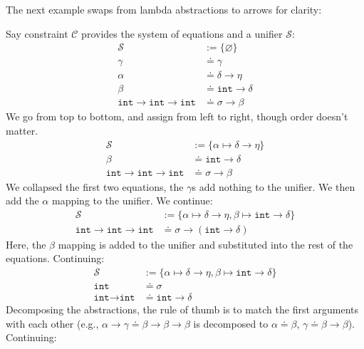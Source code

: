 \noindent
The next example swaps from lambda abstractions to arrows for clarity:
\begin{Example}

    Say constraint $\mathcal{C}$ provides the system of equations and a unifier $\mathcal{S}$:
    \begin{align*}
        \mathcal{S} &:= \{\varnothing\}\\
        \gamma &\doteq \gamma\\ 
        \alpha &\doteq \delta \to \eta \\
        \beta &\doteq \texttt{int} \to \delta\\
        \texttt{int} \to \texttt{int} \to \texttt{int} &\doteq \sigma \to \beta
    \end{align*}
    \noindent
    We go from top to bottom, and assign from left to right, though order doesn't matter.
    \begin{align*}
    \mathcal{S} &:= \{\alpha \mapsto \delta \to \eta\}\\
    \beta &\doteq \texttt{int} \to \delta\\
    \texttt{int} \to \texttt{int} \to \texttt{int} &\doteq \sigma \to \beta
    \end{align*}
    \noindent
    We collapsed the first two equations, the $\gamma$s add nothing to the unifier. We then add the $\alpha$ mapping to the unifier.
    We continue:
    \begin{align*} 
        \mathcal{S} &:= \{\alpha \mapsto \delta \to \eta, \beta \mapsto \texttt{int} \to \delta\}\\
        \texttt{int} \to \texttt{int} \to \texttt{int} &\doteq \sigma \to (\texttt{int} \to \delta)
    \end{align*}
    \noindent
    Here, the $\beta$ mapping is added to the unifier and substituted into the rest of the equations. Continuing:
    \begin{align*}
        \mathcal{S} &:= \{\alpha \mapsto \delta \to \eta, \beta \mapsto \texttt{int} \to \delta\}\\
        \texttt{int} &\doteq \sigma\\
        \texttt{int} \to \texttt{int} &\doteq \texttt{int} \to \delta
    \end{align*}
    \noindent
    Decomposing the abstractions, the rule of thumb is to match the first arguments with each other (e.g., $\alpha\to\gamma \doteq \beta\to\beta\to\beta$ is decomposed to $\alpha \doteq \beta$, $\gamma \doteq \beta\to\beta$). Continuing:

\end{Example}

